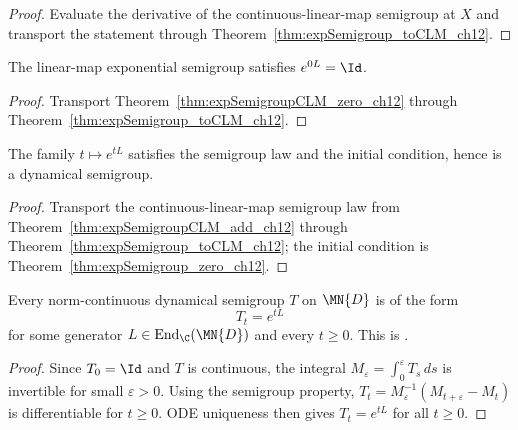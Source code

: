 \begin{proof}
    \leanok
    Evaluate the derivative of the continuous-linear-map semigroup at $X$ and transport the
    statement through Theorem~\ref{thm:expSemigroup_toCLM_ch12}.
\end{proof}

\begin{theorem}
    \label{thm:expSemigroup_zero_ch12}
    \leanok
    The linear-map exponential semigroup satisfies $e^{0L} = \Id$.
\end{theorem}

\begin{proof}
    \leanok
    Transport Theorem~\ref{thm:expSemigroupCLM_zero_ch12} through
    Theorem~\ref{thm:expSemigroup_toCLM_ch12}.
\end{proof}

\begin{theorem}
    \label{thm:expSemigroup_isDynSemigroup_ch12}
    \leanok
    The family $t \mapsto e^{tL}$ satisfies the semigroup law and the initial
    condition, hence is a dynamical semigroup.
\end{theorem}

\begin{proof}
    \leanok
    Transport the continuous-linear-map semigroup law from
    Theorem~\ref{thm:expSemigroupCLM_add_ch12} through
    Theorem~\ref{thm:expSemigroup_toCLM_ch12}; the initial condition is
    Theorem~\ref{thm:expSemigroup_zero_ch12}.
\end{proof}

\begin{theorem}
    \label{thm:continuousDynSemigroup_eq_exp_ch12}
    \leanok
    Every norm-continuous dynamical semigroup $T$ on $\MN{D}$ is
    of the form
    \[
        T_t = e^{tL}
    \]
    for some generator $L \in \mathrm{End}_{\C}(\MN{D})$ and every $t \ge 0$.
    This is \cite[Proposition~7.1]{Wolf2012Quantum}.
\end{theorem}

\begin{proof}
    \leanok
    Since $T_0 = \Id$ and $T$ is continuous, the integral
    $M_\varepsilon = \int_0^\varepsilon T_s\,ds$ is invertible for small
    $\varepsilon > 0$.
    Using the semigroup property,
    $T_t = M_\varepsilon^{-1}(M_{t+\varepsilon} - M_t)$
    is differentiable for $t \ge 0$.
    ODE uniqueness then gives $T_t = e^{tL}$ for all $t \ge 0$.
\end{proof}

